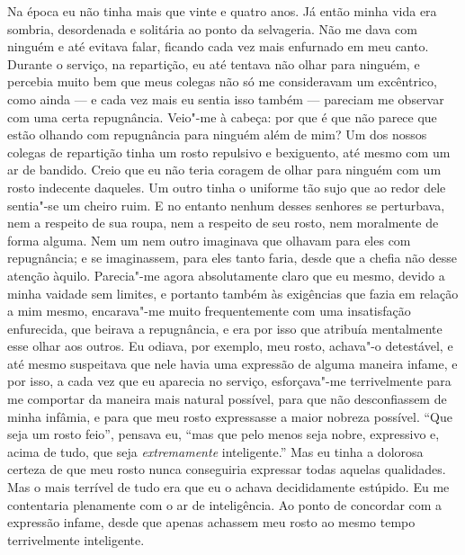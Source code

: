 Na época eu não tinha mais que vinte e quatro anos. Já então minha vida
era sombria, desordenada e solitária ao ponto da selvageria. Não me
dava com ninguém e até evitava falar, ficando cada vez mais enfurnado
em meu canto. Durante o serviço, na repartição, eu até tentava não
olhar para ninguém, e percebia muito bem que meus colegas não só me
consideravam um excêntrico, como ainda --- e cada vez mais eu sentia isso
também --- pareciam me observar com uma certa repugnância. Veio"-me à
cabeça: por que é que não parece que estão olhando com repugnância para
ninguém além de mim? Um dos nossos colegas de repartição tinha um rosto
repulsivo e bexiguento, até mesmo com um ar de bandido. Creio que eu
não teria coragem de olhar para ninguém com um rosto indecente
daqueles. Um outro tinha o uniforme tão sujo que ao redor dele
sentia"-se um cheiro ruim. E no entanto nenhum desses senhores se
perturbava, nem a respeito de sua roupa, nem a respeito de seu rosto,
nem moralmente de forma alguma. Nem um nem outro imaginava que olhavam
para eles com repugnância; e se imaginassem, para eles tanto faria,
desde que a chefia não desse atenção àquilo. Parecia"-me agora
absolutamente claro que eu mesmo, devido a minha vaidade sem limites, e
portanto também às exigências que fazia em relação a mim mesmo,
encarava"-me muito frequentemente com uma insatisfação enfurecida, que
beirava a repugnância, e era por isso que atribuía mentalmente esse
olhar aos outros. Eu odiava, por exemplo, meu rosto, achava"-o
detestável, e até mesmo suspeitava que nele havia uma expressão de
alguma maneira infame, e por isso, a cada vez que eu aparecia no
serviço, esforçava"-me terrivelmente para me comportar da maneira mais
natural possível, para que não desconfiassem de minha infâmia, e para
que meu rosto expressasse a maior nobreza possível. ``Que seja um rosto
feio'', pensava eu, ``mas que pelo menos seja nobre, expressivo e, acima
de tudo, que seja \textit{extremamente} inteligente.'' Mas eu tinha a
dolorosa certeza de que meu rosto nunca conseguiria expressar todas
aquelas qualidades. Mas o mais terrível de tudo era que eu o achava
decididamente estúpido. Eu me contentaria plenamente com o ar de
inteligência. Ao ponto de concordar com a expressão infame, desde que
apenas achassem meu rosto ao mesmo tempo terrivelmente inteligente.

